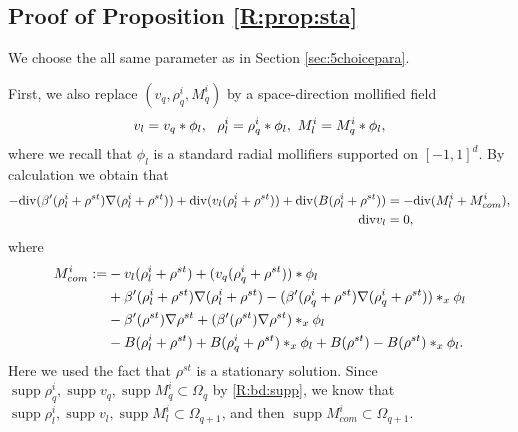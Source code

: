 \documentclass[UTF-8,reqno]{amsart}
\numberwithin{equation}{section}
\theoremstyle{definition}
\DeclareMathOperator{\supp}{supp}
\def\div{\mathord{{\rm div}}}
\def\div{\mathord{{\rm div}}}
\begin{document}
  


\subsection{Proof of Proposition \ref{R:prop:sta}}  
We choose the all same parameter as in Section \ref{sec:5choicepara}.

First,  we also replace $(v_{q},  \rho^i_{q},M^i_q)$ by a space-direction mollified field  
\begin{align}
v_l=v_{q}*\phi_l,\ \ 
   \rho^i_l=  \rho^i_{q}*\phi_l,\  M^i_l=M^i_{q}* \phi_l,\notag
\end{align}
where we recall that $\phi_l$ is a   standard radial mollifiers supported on $[-1,1]^d$.  
By calculation we obtain that 
\begin{align*}
-\div(\beta'(\rho^i _l+\rho^{st}) \nabla(\rho^i _l+\rho^{st}))+\div(v_l   (\rho^i _l+\rho^{st}))+\div(B(\rho^i _l+\rho^{st}))&=-\div (M^i_l+M^i_{com} ),\\
\div v_l&=0,
\end{align*}
where
\begin{align*}
M^i_{com} :=&-v_l  ( \rho^i_l+\rho^{st})+(v_{q}  ( \rho^i_{q}+\rho^{st}))* \phi_l\\
&+\beta'(\rho^i _l+\rho^{st}) \nabla(\rho^i _l+\rho^{st})-(\beta'(\rho^i _q+\rho^{st}) \nabla(\rho^i _q+\rho^{st}))*_x\phi_l\\
&-\beta'(\rho^{st}) \nabla\rho^{st}+(\beta'(\rho^{st}) \nabla\rho^{st})*_x\phi_l\\
 &  -B(\rho_l^i+\rho^{st})+B(\rho_q^i+\rho^{st})*_x\phi_l +B(\rho^{st})-B(\rho^{st})*_x\phi_l.\notag
\end{align*}
 Here we used the fact that $\rho^{st}$ is a stationary solution. Since $  \supp\rho_q^i,\supp v_q,\supp M_q^i\subset\Omega_q $ by \eqref{R:bd:supp}, we know that $  \supp\rho_l^i,\supp v_l,\supp M_l^i\subset\Omega_{q+1} $, and then $\supp M_{com}^i\subset\Omega_{q+1} $. 
 
\end{document}
